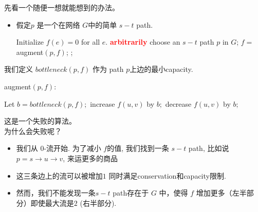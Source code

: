 先看一个随便一想就能想到的办法。

 \begin{itemize}
 \item
假定$p$ 是一个在网络 $G$中的简单 ${s-t}$ path.

  \begin{algorithmic}[1]
    \STATE Initialize $f(e)=0$ for all $e$.
    \STATE  \textcolor{red}{\bf arbitrarily} choose an $s-t$ path $p$ in $G$;
    \STATE $f = ${\sc augment}$(p, f)$;
    \ENDWHILE
    ;
  \end{algorithmic}
\end{itemize}

我们定义 $bottleneck(p, f)$ 作为 path $p$上边的最小capacity.

{\sc augment}$(p, f):$\\
  \begin{algorithmic}[1]
  \STATE Let $b=bottleneck(p, f);$
    \STATE increase $f(u,v)$ by $b;$
    \ELSE
    \STATE decrease $f(u,v)$ by $b;$
    \ENDIF
    \ENDFOR
  \end{algorithmic}

这是一个失败的算法。\\

为什么会失败呢？

\begin{itemize}
 \item
我们从 0-流开始.
为了减小 $f$的值, 我们找到一条 $s-t$ path, 比如说 $p = s\rightarrow u  \rightarrow v$, 来运更多的商品
\item
这三条边上的流可以被增加$1$ 同时满足conservation和capacity限制.
\item
然而，我们不能发现一条$s-t$ path存在于 $G$ 中，使得 $f$ 增加更多（左半部分）即使最大流是$2$ (右半部分).

\end{itemize}


